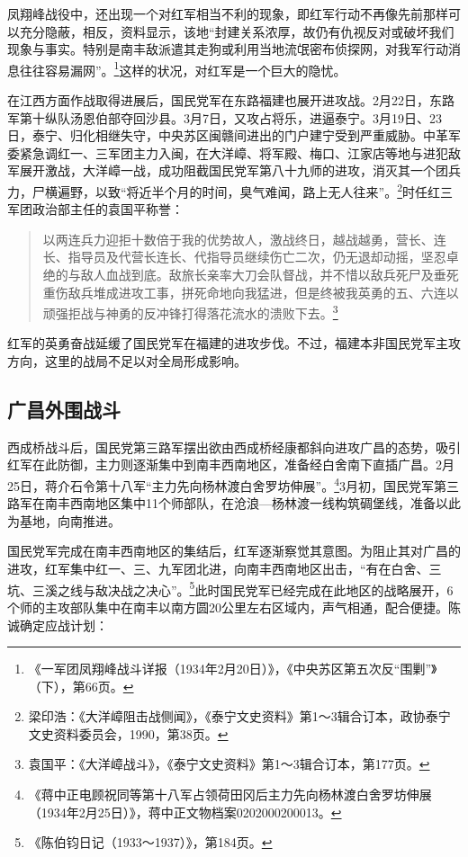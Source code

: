 凤翔峰战役中，还出现一个对红军相当不利的现象，即红军行动不再像先前那样可以充分隐蔽，相反，资料显示，该地“封建关系浓厚，故仍有仇视反对或破坏我们现象与事实。特别是南丰敌派遣其走狗或利用当地流氓密布侦探网，对我军行动消息往往容易漏网”。\footnote{《一军团凤翔峰战斗详报（1934年2月20日）》，《中央苏区第五次反“围剿”》（下），第66页。}这样的状况，对红军是一个巨大的隐忧。


在江西方面作战取得进展后，国民党军在东路福建也展开进攻战。2月22日，东路军第十纵队汤恩伯部夺回沙县。3月7日，又攻占将乐，进逼泰宁。3月19日、23日，泰宁、归化相继失守，中央苏区闽赣间进出的门户建宁受到严重威胁。中革军委紧急调红一、三军团主力入闽，在大洋嶂、将军殿、梅口、江家店等地与进犯敌军展开激战，大洋嶂一战，成功阻截国民党军第八十九师的进攻，消灭其一个团兵力，尸横遍野，以致“将近半个月的时间，臭气难闻，路上无人往来”。\footnote{梁印浩：《大洋嶂阻击战侧闻》，《泰宁文史资料》第1～3辑合订本，政协泰宁文史资料委员会，1990，第38页。}时任红三军团政治部主任的袁国平称誉：

\begin{quote}

以两连兵力迎拒十数倍于我的优势故人，激战终日，越战越勇，营长、连长、指导员及代营长连长、代指导员继续伤亡二次，仍无退却动摇，坚忍卓绝的与敌人血战到底。敌旅长亲率大刀会队督战，并不惜以敌兵死尸及垂死重伤敌兵堆成进攻工事，拼死命地向我猛进，但是终被我英勇的五、六连以顽强拒战与神勇的反冲锋打得落花流水的溃败下去。\footnote{袁国平：《大洋嶂战斗》，《泰宁文史资料》第1～3辑合订本，第177页。}
\end{quote}


红军的英勇奋战延缓了国民党军在福建的进攻步伐。不过，福建本非国民党军主攻方向，这里的战局不足以对全局形成影响。

\subsection{广昌外围战斗}


西成桥战斗后，国民党第三路军摆出欲由西成桥经康都斜向进攻广昌的态势，吸引红军在此防御，主力则逐渐集中到南丰西南地区，准备经白舍南下直插广昌。2月25日，蒋介石令第十八军“主力先向杨林渡白舍罗坊伸展”。\footnote{《蒋中正电顾祝同等第十八军占领荷田冈后主力先向杨林渡白舍罗坊伸展（1934年2月25日）》，蒋中正文物档案0202000200013。}3月初，国民党军第三路军在南丰西南地区集中11个师部队，在沧浪—杨林渡一线构筑碉堡线，准备以此为基地，向南推进。


国民党军完成在南丰西南地区的集结后，红军逐渐察觉其意图。为阻止其对广昌的进攻，红军集中红一、三、九军团北进，向南丰西南地区出击，“有在白舍、三坑、三溪之线与敌决战之决心”。\footnote{《陈伯钧日记（1933～1937）》，第184页。}此时国民党军已经完成在此地区的战略展开，6个师的主攻部队集中在南丰以南方圆20公里左右区域内，声气相通，配合便捷。陈诚确定应战计划：

